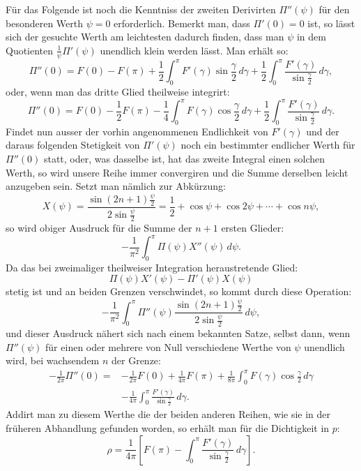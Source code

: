 \documentclass[11pt]{article}
\newcommand{\dd}{\,d}
\begin{document}
Für das Folgende ist noch die Kenntniss der zweiten Derivirten $\Pi''(\psi)$ für den besonderen Werth $\psi=0$ erforderlich. Bemerkt man, dass $\Pi'(0)=0$ ist, so lässt sich der gesuchte Werth am leichtesten dadurch finden, dass man $\psi$ in dem Quotienten $\frac1\psi\Pi'(\psi)$ unendlich klein werden lässt. Man erhält so:
\[
 \Pi''(0)=F(0)-F(\pi)+\frac12\int_0^\pi F'(\gamma)\sin\frac{\gamma}{2}\dd\gamma
 +\frac12\int_0^\pi \frac{F'(\gamma)}{\sin\frac{\gamma}{2}}\dd\gamma,
\]
oder, wenn man das dritte Glied theilweise integrirt:
\[
 \Pi''(0)=F(0)-\frac12 F(\pi)-\frac14\int_0^\pi F(\gamma)\cos\frac{\gamma}{2}\dd\gamma
 +\frac12\int_0^\pi \frac{F'(\gamma)}{\sin\frac{\gamma}{2}}\dd\gamma.
\]
Findet nun ausser der vorhin angenommenen Endlichkeit von $F'(\gamma)$ und der daraus folgenden Stetigkeit von $\Pi'(\psi)$ noch ein bestimmter endlicher Werth für $\Pi''(0)$ statt, oder, was dasselbe ist, hat das zweite Integral einen solchen Werth, so wird unsere Reihe immer convergiren und die Summe derselben leicht anzugeben sein. Setzt man nämlich zur Abkürzung:
\[
 X(\psi)=\frac{\sin(2n+1)\frac{\psi}{2}}{2\sin\frac{\psi}{2}}=\frac12+\cos\psi+\cos2\psi+\cdots+\cos n\psi,
\]
so wird obiger Ausdruck für die Summe der $n+1$ ersten Glieder:
\[
 -\frac1{\pi^2}\int_0^\pi \Pi(\psi)X''(\psi)\dd\psi.
\]
Da das bei zweimaliger theilweiser Integration heraustretende Glied:
\[
 \Pi(\psi)X'(\psi)-\Pi'(\psi)X(\psi)
\]
stetig ist und an beiden Grenzen verschwindet, so kommt durch diese Operation:
\[
 -\frac1{\pi^2}\int_0^\pi \Pi''(\psi)\frac{\sin(2n+1)\frac{\psi}{2}}{2\sin\frac{\psi}{2}}\dd\psi,
\]
und dieser Ausdruck nähert sich nach einem bekannten Satze, selbst dann, wenn $\Pi''(\psi)$ für einen oder mehrere von Null verschiedene Werthe von $\psi$ unendlich wird, bei wachsendem $n$ der Grenze:
\begin{align*}
 -\frac1{2\pi}\Pi''(0)=&-\frac1{2\pi}F(0)+\frac1{4\pi}F(\pi)
 +\frac1{8\pi}\int_0^\pi F(\gamma)\cos\frac{\gamma}{2}\dd\gamma \\
&-\frac1{4\pi}\int_0^\pi \frac{F'(\gamma)}{\sin\frac{\gamma}{2}}\dd\gamma.
\end{align*}
Addirt man zu diesem Werthe die der beiden anderen Reihen, wie sie in der früheren Abhandlung gefunden worden, so erhält man für die Dichtigkeit in $p$:
\[
 \rho=\frac1{4\pi}\left[F(\pi)-\int_0^\pi \frac{F'(\gamma)}{\sin\frac{\gamma}{2}}\dd\gamma\right].
\]
\end{document}
